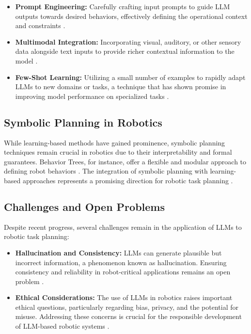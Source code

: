 \documentclass[pdflatex,sn-mathphys-num]{sn-jnl}
\theoremstyle{thmstyleone}
\theoremstyle{thmstyletwo}%
\theoremstyle{thmstylethree}%
\begin{document}
\begin{itemize}
    \item \textbf{Prompt Engineering:} Carefully crafting input prompts to guide LLM outputs towards desired behaviors, effectively defining the operational context and constraints \cite{liu2023llmpempoweringlargelanguage}.
    
    \item \textbf{Multimodal Integration:} Incorporating visual, auditory, or other sensory data alongside text inputs to provide richer contextual information to the model \cite{jiang2022vima}.
    
    \item \textbf{Few-Shot Learning:} Utilizing a small number of examples to rapidly adapt LLMs to new domains or tasks, a technique that has shown promise in improving model performance on specialized tasks \cite{brown2020languagemodelsfewshotlearners}.
\end{itemize}

\subsection{Symbolic Planning in Robotics}
While learning-based methods have gained prominence, symbolic planning techniques remain crucial in robotics due to their interpretability and formal guarantees. Behavior Trees, for instance, offer a flexible and modular approach to defining robot behaviors \cite{JIANG2022100869}. The integration of symbolic planning with learning-based approaches represents a promising direction for robotic task planning \cite{koyama2022study}. 

\subsection{Challenges and Open Problems}
Despite recent progress, several challenges remain in the application of LLMs to robotic task planning:

\begin{itemize}
    \item \textbf{Hallucination and Consistency:} LLMs can generate plausible but incorrect information, a phenomenon known as hallucination. Ensuring consistency and reliability in robot-critical applications remains an open problem \cite{yang2023plug}.
    
    \item \textbf{Ethical Considerations:} The use of LLMs in robotics raises important ethical questions, particularly regarding bias, privacy, and the potential for misuse. Addressing these concerns is crucial for the responsible development of LLM-based robotic systems \cite{chen2023frugalgptuselargelanguage}.
\end{itemize}
\end{document}

